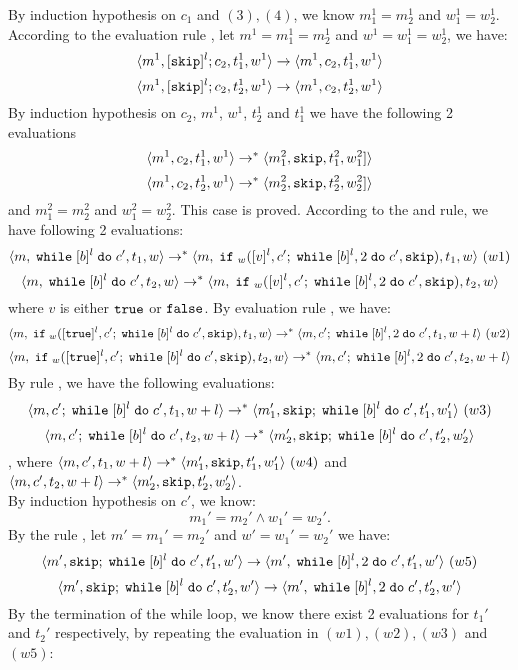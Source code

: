 {\begin{subproof}
\[\]
%
%
By induction hypothesis on $c_1$ and $(3), (4)$, we know $m_1^1= m_2^1$ and $w_1^1= w_2^1$.
%
\\
%
According to the evaluation rule , let $m^1 = m_1^1= m_2^1$ and $w^1 = w_1^1= w_2^1$, we have:
%
\[
\langle m^1, [\mathtt{skip}]^l;c_2, t_1^1, w^1 \rangle \to \langle m^1, c_2, t_1^1, w^1 \rangle
\]
%
\[
\langle m^1, [\mathtt{skip}]^l;c_2, t_2^1, w^1 \rangle \to \langle m^1, c_2, t_2^1, w^1 \rangle
\]
%
%
%
By induction hypothesis on $c_2$, $m^1$, $w^1$, $t_2^1$ and $t_1^1$ we have the following 2 evaluations 
%
\[
	\langle m^1, c_2, t_1^1, w^1 \rangle \to^{*} \langle m_1^2, \mathtt{skip}, t_1^2, w_1^2] \rangle
\]
%
\[
	\langle m^1, c_2, t_2^1, w^1 \rangle \to^{*} \langle m_2^2, \mathtt{skip}, t_2^2, w_2^2] \rangle
\]
%
and $m_1^2= m_2^2$ and $w_1^2= w_2^2$.
%
%
This case is proved.
%
%
According to the  and  rule, we have following 2 evaluations:
%
\[
	\langle m, \;\mathtt{while}\; [b]^l \;\mathtt{do}\; c', t_1, w \rangle \to^{*}
	\langle m, \;\mathtt{if}\;_w([v]^l, c';\;\mathtt{while}\; [b]^l, 2 \;\mathtt{do}\; c', \mathtt{skip}), t_1, w \rangle ~ (w1)
\]
%
\[
	\langle m, \;\mathtt{while}\; [b]^l \;\mathtt{do}\; c', t_2, w \rangle \to^{*}
	\langle m, \;\mathtt{if}\;_w([v]^l, c';\;\mathtt{while}\; [b]^l, 2 \;\mathtt{do}\; c', \mathtt{skip}), t_2, w \rangle
\]
%
where $v$ is either $\mathtt{true}$ or $\mathtt{false}$.
%
%
By evaluation rule , we have:
%
\[
	\langle m, \;\mathtt{if}\;_w([\mathtt{true}]^l, c';\;\mathtt{while}\; [b]^l \;\mathtt{do}\; c', \mathtt{skip}), t_1, w \rangle 
	\to^{*} \langle m, c';\;\mathtt{while}\; [b]^l, 2 \;\mathtt{do}\; c', t_1, w+l \rangle ~ (w2)
\]
%
\[
	\langle m, \;\mathtt{if}\;_w([\mathtt{true}]^l, c';\;\mathtt{while}\; [b]^l \;\mathtt{do}\; c', \mathtt{skip}), t_2, w \rangle 
	\to^{*} \langle m, c';\;\mathtt{while}\; [b]^l, 2 \;\mathtt{do}\; c', t_2, w+l \rangle 
\]
%
%
By rule , we have the following evaluations:
%
\[
	\langle m, c';\;\mathtt{while}\; [b]^l \;\mathtt{do}\; c', t_1, w+l \rangle \to^{*} \langle m_1', \mathtt{skip};\;\mathtt{while}\; [b]^l \;\mathtt{do}\; c', t_1', w_1' \rangle~ (w3)
\] 
%
%
\[
	\langle m, c';\;\mathtt{while}\; [b]^l \;\mathtt{do}\; c', t_2, w+l \rangle \to^{*} \langle m_2', \mathtt{skip};\;\mathtt{while}\; [b]^l \;\mathtt{do}\; c', t_2', w_2' \rangle
\] 
%
, where 
$\langle m, c', t_1, w+l \rangle \to^{*} \langle m_1', \mathtt{skip}, t_1', w_1' \rangle ~ (w4)$
and
$\langle m, c', t_2, w+l \rangle \to^{*} \langle m_2', \mathtt{skip}, t_2', w_2' \rangle$. 
%
\\
%
By induction hypothesis on $c'$, we know:
\[
m_1' = m_2' \land w_1' = w_2'.
\]
%
By the rule , let $m' = m_1' = m_2'$ and $w' = w_1' = w_2'$ we have:
%
\[
	\langle m', \mathtt{skip};\;\mathtt{while}\; [b]^l \;\mathtt{do}\; c', t_1', w' \rangle \to \langle m', \;\mathtt{while}\; [b]^l, 2 \;\mathtt{do}\; c', t_1', w' \rangle ~ (w5)
\]
%
\[
	\langle m', \mathtt{skip};\;\mathtt{while}\; [b]^l \;\mathtt{do}\; c', t_2', w' \rangle \to \langle m', \;\mathtt{while}\; [b]^l, 2 \;\mathtt{do}\; c', t_2', w' \rangle
\]
%
By the termination of the while loop, we know there exist 2 evaluations for $t_1'$ and $t_2'$ respectively,
by repeating the evaluation in $(w1), (w2), (w3)$ and $(w5)$:

\end{subproof}}
